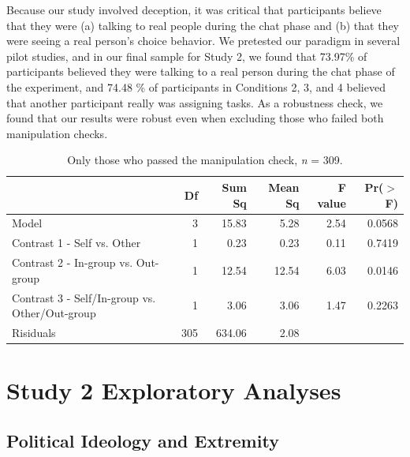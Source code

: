 \documentclass[12pt,]{article}
\begin{document}
Because our study involved deception, it was critical that participants believe that they were (a) talking to real people during the chat phase and (b) that they were seeing a real person's choice behavior. We pretested our paradigm in several pilot studies, and in our final sample for Study 2, we found that  73.97\% of participants believed they were talking to a real person during the chat phase of the experiment, and 74.48 \% of participants in Conditions 2, 3, and 4 believed that another participant really was assigning tasks. As a robustness check, we found that our results were robust even when excluding those who failed both manipulation checks. 

\vspace{0.6cm}

\begin{table}[ht]
\centering
\begin{tabular}{lrrrrr}
  \hline
 & Df & Sum Sq & Mean Sq & F value & Pr($>$F) \\ 
  \hline
Model & 3 & 15.83 & 5.28 & 2.54 & 0.0568 \\ 
  Contrast 1 - Self vs. Other & 1 & 0.23 & 0.23 & 0.11 & 0.7419 \\ 
  Contrast 2 - In-group vs. Out-group & 1 & 12.54 & 12.54 & 6.03 & 0.0146 \\ 
  Contrast 3 - Self/In-group vs. Other/Out-group & 1 & 3.06 & 3.06 & 1.47 & 0.2263 \\ 
  Risiduals & 305 & 634.06 & 2.08 &  &  \\ 
   \hline
\end{tabular}
\caption{Only those who passed the manipulation check, \emph{n} = 309.} 
\label{manip2}
\end{table}



\clearpage
\section{Study 2 Exploratory Analyses}
\label{appendix:explore2}



\subsection{Political Ideology and Extremity}
\label{appendix:ideo_extrem2}
\end{document}
